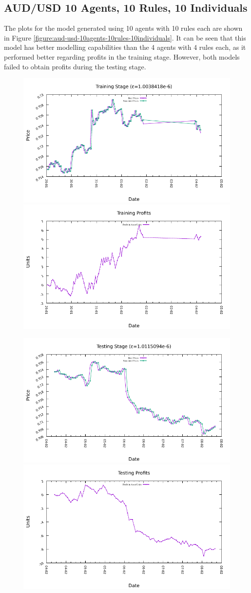 \newpage

\subsection{AUD/USD 10 Agents, 10 Rules, 10 Individuals}
\label{results:forecast-aud-usd-10agents-10rules-10individuals}

The plots for the model generated using 10 agents with 10 rules each are shown
in Figure \ref{figure:aud-usd-10agents-10rules-10individuals}. It can be seen
that this model has better modelling capabilities than the 4 agents with 4 rules
each, as it performed better regarding profits in the training stage. However,
both models failed to obtain profits during the testing stage.

\begin{figure}[htp]
  \centering

  \includegraphics[width=.45\textwidth]{img/plots/aud_usd_h1-10agents-10rules-10ind-100gen_training_fit.pdf}\quad
  \includegraphics[width=.45\textwidth]{img/plots/aud_usd_h1-10agents-10rules-10ind-100gen_training_profits.pdf}

  \medskip

  \includegraphics[width=.45\textwidth]{img/plots/aud_usd_h1-10agents-10rules-10ind-100gen_testing_fit.pdf}\quad
  \includegraphics[width=.45\textwidth]{img/plots/aud_usd_h1-10agents-10rules-10ind-100gen_testing_profits.pdf}


\end{figure}
